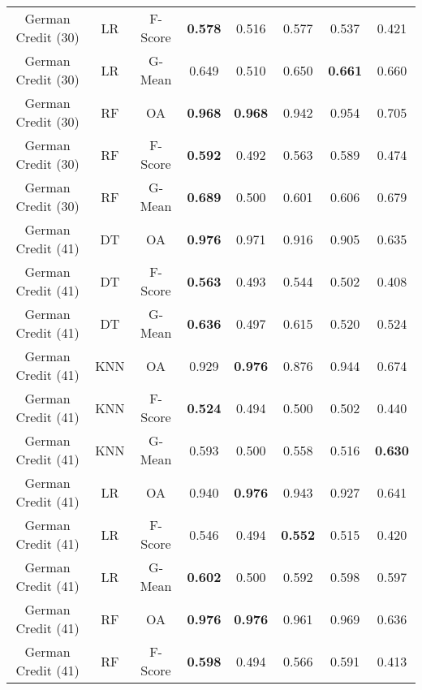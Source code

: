 \begin{longtable}{cccccccc}
German Credit (30) &         LR & F-Score & \textbf{0.578} &          0.516 &          0.577 &          0.537 &          0.421 \\
German Credit (30) &         LR &  G-Mean &          0.649 &          0.510 &          0.650 & \textbf{0.661} &          0.660 \\
German Credit (30) &         RF &      OA & \textbf{0.968} & \textbf{0.968} &          0.942 &          0.954 &          0.705 \\
German Credit (30) &         RF & F-Score & \textbf{0.592} &          0.492 &          0.563 &          0.589 &          0.474 \\
German Credit (30) &         RF &  G-Mean & \textbf{0.689} &          0.500 &          0.601 &          0.606 &          0.679 \\
German Credit (41) &         DT &      OA & \textbf{0.976} &          0.971 &          0.916 &          0.905 &          0.635 \\
German Credit (41) &         DT & F-Score & \textbf{0.563} &          0.493 &          0.544 &          0.502 &          0.408 \\
German Credit (41) &         DT &  G-Mean & \textbf{0.636} &          0.497 &          0.615 &          0.520 &          0.524 \\
German Credit (41) &        KNN &      OA &          0.929 & \textbf{0.976} &          0.876 &          0.944 &          0.674 \\
German Credit (41) &        KNN & F-Score & \textbf{0.524} &          0.494 &          0.500 &          0.502 &          0.440 \\
German Credit (41) &        KNN &  G-Mean &          0.593 &          0.500 &          0.558 &          0.516 & \textbf{0.630} \\
German Credit (41) &         LR &      OA &          0.940 & \textbf{0.976} &          0.943 &          0.927 &          0.641 \\
German Credit (41) &         LR & F-Score &          0.546 &          0.494 & \textbf{0.552} &          0.515 &          0.420 \\
German Credit (41) &         LR &  G-Mean & \textbf{0.602} &          0.500 &          0.592 &          0.598 &          0.597 \\
German Credit (41) &         RF &      OA & \textbf{0.976} & \textbf{0.976} &          0.961 &          0.969 &          0.636 \\
German Credit (41) &         RF & F-Score & \textbf{0.598} &          0.494 &          0.566 &          0.591 &          0.413 \\

\end{longtable}
